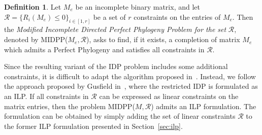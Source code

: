 \documentclass[a4paper,USenglish]{article}
\theoremstyle{definition}
\newtheorem{definition}{Definition}
\begin{document}
  \begin{definition}\label{def:MIDPP}
    Let $M_{e}$ be an incomplete binary matrix, and let 
    $\mathcal{R}=\{R_i(M_e)\le 0\}_{i\in [1,r]} $  be a set 
    of $r$ constraints on the entries of $M_e$.
%
Then the \emph{Modified Incomplete Directed Perfect Phylogeny Problem for the set}
    $\mathcal R$, denoted by MIDPP($M_e,\mathcal R$),  asks to find, if it exists,
     a completion of matrix $M_e$ which admits a Perfect Phylogeny and 
   satisfies all constraints in $\mathcal R$.
%
  \end{definition}

Since the resulting variant of the IDP problem includes some additional constraints, it is  difficult 
to adapt the algorithm proposed in~\cite{Peer_2004}. 
Instead, we follow the approach proposed by Gusfield 
in~\cite{gusfield_persistent_2015}, where  
the restricted IDP is formulated as an ILP. 
If all constraints in $\mathcal R$ can be
  expressed as linear constraints on the matrix entries, then
  the problem MIDPP($M, \mathcal R$) admits an ILP formulation.
  The formulation can be obtained by
  simply adding  the set of linear constraints $\mathcal R$ to the former
  ILP formulation presented in Section~\ref{sec:ilp}.





\end{document}
